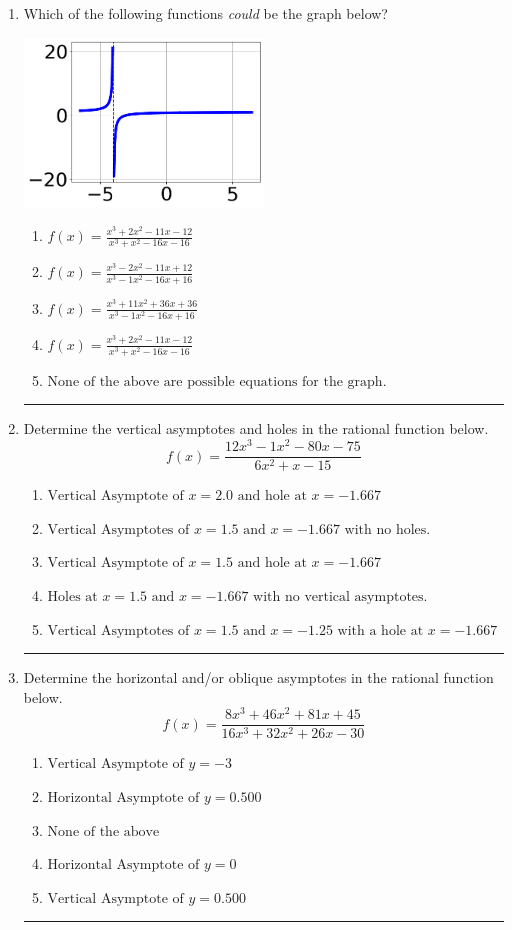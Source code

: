 \documentclass[14pt]{extbook}
\newcommand{\litem}[1]{\item#1\hspace*{-1cm}\rule{\textwidth}{0.4pt}}
\begin{document}
\begin{enumerate}
{\begin{enumerate}[label=\Alph*.]
\end{enumerate} }
\litem{
Which of the following functions \textit{could} be the graph below?
\begin{center}
    \includegraphics[width=0.5\textwidth]{../Figures/identifyGraphOfRationalFunctionA.png}
\end{center}
\begin{enumerate}[label=\Alph*.]
\item \( f(x)=\frac{x^{3} +2 x^{2} -11 x -12}{x^{3} + x^{2} -16 x -16} \)
\item \( f(x)=\frac{x^{3} -2 x^{2} -11 x + 12}{x^{3} -1 x^{2} -16 x + 16} \)
\item \( f(x)=\frac{x^{3} +11 x^{2} +36 x + 36}{x^{3} -1 x^{2} -16 x + 16} \)
\item \( f(x)=\frac{x^{3} +2 x^{2} -11 x -12}{x^{3} + x^{2} -16 x -16} \)
\item \( \text{None of the above are possible equations for the graph.} \)

\end{enumerate} }
\litem{
Determine the vertical asymptotes and holes in the rational function below.\[ f(x) = \frac{12x^{3} -1 x^{2} -80 x -75}{6x^{2} +x -15} \]\begin{enumerate}[label=\Alph*.]
\item \( \text{Vertical Asymptote of } x = 2.0 \text{ and hole at } x = -1.667 \)
\item \( \text{Vertical Asymptotes of } x = 1.5 \text{ and } x = -1.667 \text{ with no holes.} \)
\item \( \text{Vertical Asymptote of } x = 1.5 \text{ and hole at } x = -1.667 \)
\item \( \text{Holes at } x = 1.5 \text{ and } x = -1.667 \text{ with no vertical asymptotes.} \)
\item \( \text{Vertical Asymptotes of } x = 1.5 \text{ and } x = -1.25 \text{ with a hole at } x = -1.667 \)

\end{enumerate} }
\litem{
Determine the horizontal and/or oblique asymptotes in the rational function below.\[ f(x) = \frac{8x^{3} +46 x^{2} +81 x + 45}{16x^{3} +32 x^{2} +26 x -30} \]\begin{enumerate}[label=\Alph*.]
\item \( \text{Vertical Asymptote of } y = -3  \)
\item \( \text{Horizontal Asymptote of } y = 0.500  \)
\item \( \text{None of the above} \)
\item \( \text{Horizontal Asymptote of } y = 0  \)
\item \( \text{Vertical Asymptote of } y = 0.500  \)


\end{enumerate}}
\end{enumerate}
\end{document}
